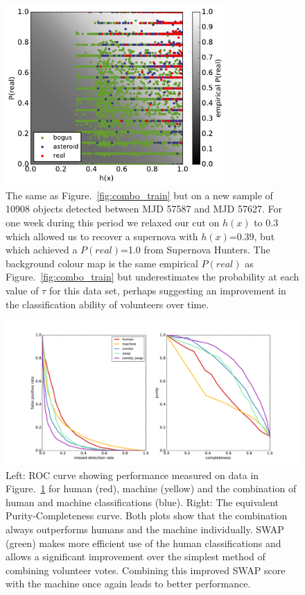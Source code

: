 \message{ !name(blank.tex)}\documentclass[a4paper,fleqn,usenatbib]{mnras}
\begin{document}
\begin{figure}
   \includegraphics[width=84mm]{figs/human_v_machine_20160725-20160829.pdf}
   \caption{The same as Figure.~\ref{fig:combo_train} but on a new sample of 10908 objects detected between
            MJD 57587 and MJD 57627.  For one week during this period we relaxed our cut on $h(x)$ to 0.3 which allowed us to recover a supernova with $h(x)$=0.39, but which achieved a $P(real)$=1.0 from Supernova Hunters.  The background colour map is the same empirical $P(real)$ as Figure.~\ref{fig:combo_train} but underestimates the probability at each value of $\tau$ for this data set, perhaps suggesting an improvement in the classification ability of volunteers over time.}
   \label{fig:combo_test} 
\end{figure}

\begin{figure}
   \begin{minipage}{160mm}
   \includegraphics[trim=30mm 10mm 30mm 10mm,clip,width=160mm]{figs/combo_swap_roc.pdf}
   \caption{Left: ROC curve showing performance measured on data in Figure.~\ref{fig:combo_test} for human (red), machine (yellow) and
            the combination of human and machine classifications (blue).  Right: The equivalent Purity-Completeness curve.  Both
            plots show that the combination always outperforms humans and the machine individually.  SWAP (green) makes more efficient use of the human classifications and allows a significant improvement over the simplest method of combining volunteer votes.  Combining this improved SWAP score with the machine once again leads to better performance.} 
   \label{fig:roc} 
   \end{minipage}
\end{figure}
\end{document}
